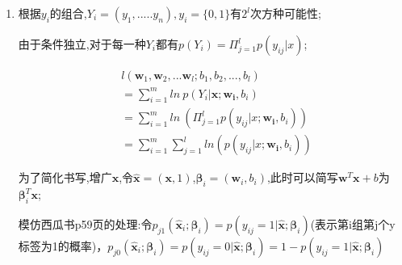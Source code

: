 \documentclass[11pt, a4paper, UTF8]{ctexart}
\begin{document}
\begin{solution}
  \begin{enumerate}
  	\item %
  	
  	 
  
  根据$y_i$的组合,$Y_i=(y_1,.....y_n),y_i=\{0,1\}$有$2^{l}$次方种可能性;
  
  由于条件独立,对于每一种$Y_i$都有$p(Y_i)=\Pi_{j=1}^{l} p(y_{ij}|x)$;
  
  
  
  \begin{equation}
  \begin{aligned}
  &l(\bm{w}_1,\bm{w}_2,...\bm{w}_l;b_1,b_2,...,b_l)
  \\ &=\sum_{i=1}^{m}ln~p(Y_i|\bm{x};\bm{w_i},b_i)
  \\ &=\sum_{i=1}^{m} ln~(\Pi _{j=1}^{l} p(y_{ij}|x;\bm{w_i},b_i))
  \\ &=\sum_{i=1}^{m} \sum _{j=1}^{l} ln(p(y_{ij}|x;\bm{w_i},b_i))
  \end{aligned}
  \end{equation}

为了简化书写,增广$\bm{x}$,令$\hat{\bm{x}}=(\bm{x},1)$,$\bm{\beta}_{i}=(\bm {w}_i,b_i)$,此时可以简写$\bm{w}^{T}\bm{x}+b$为$\bm{\beta}_i^{T}\bm{x}$;

模仿西瓜书p59页的处理:令$p_{j1}(\hat{\bm{x}}_i;\bm{\beta}_i)=p(y_{ij}=1|\hat{\bm{x}};\bm{\beta}_i )$(表示第i组第j个y标签为1的概率)，$p_{j0}(\hat{\bm{x}}_i;\bm{\beta}_i)=p(y_{ij}=0|\hat{\bm{x}};\bm{\beta}_i )=1-p(y_{ij}=1|\hat{\bm{x}};\bm{\beta}_i )$


\end{enumerate}
\end{solution}
\end{document}
